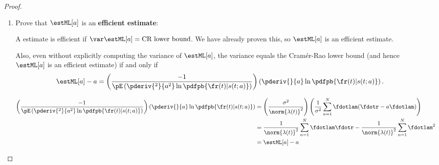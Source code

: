\begin{proof}
\begin{enumerate}
\item Prove that $\estML[a]$ is an {\bf efficient estimate}:

A estimate is efficient if
$\var\estML[a]=\mbox{CR lower bound}$.
We have already proven this, so $\estML[a]$ is an efficient estimate.

Also, even without explicitly computing the variance of $\estML[a]$,
the variance equals the Cram\'er-Rao lower bound
(and hence $\estML[a]$ is an efficient estimate)
if and only if
\[ \estML[a] -  a =
   \left( \frac{-1}{\pE\left(
              \pderiv{^2}{ a^2} \ln \pdfpb{\fr(t)|s(t; a)}
           \right)} \right)
   \left(\pderiv{}{ a} \ln \pdfpb{\fr(t)|s(t; a)} \right).
\]

\begin{align*}
   \left( \frac{-1}{\pE\left(
              \pderiv{^2}{ a^2} \ln \pdfpb{\fr(t)|s(t; a)}
           \right)} \right)
   \left(\pderiv{}{ a} \ln \pdfpb{\fr(t)|s(t; a)} \right)
     &= \left(\frac{\sigma^2}{\norm{\lambda(t)}^2}\right)
         \left(
           \frac{1}{\sigma^2} \sum_{n=1}^N \fdotlam( \fdotr - a \fdotlam)
         \right)
   \\&= \frac{1}{\norm{\lambda(t)}^2} \sum_{n=1}^N \fdotlam \fdotr -
         \frac{1}{\norm{\lambda(t)}^2} \sum_{n=1}^N \fdotlam^2
   \\&= \estML[a] - a
\end{align*}


\end{enumerate}
\end{proof}


